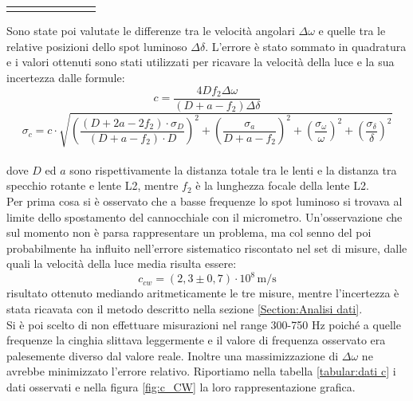 \documentclass{article}
\begin{document}
\begin{table}[H]
\begin{tabular}{c c c c c c c c}
                    \bottomrule           
                    
                    \label{tabular:rawdataCW}
                    
                \end{tabular}


            \end{table}
            Sono state poi valutate le differenze tra le velocità angolari $\Delta\omega$ e quelle tra le relative posizioni dello spot luminoso $\Delta\delta$. 
            L'errore è stato sommato in quadratura e i valori ottenuti sono stati utilizzati per ricavare la velocità della luce e la sua incertezza
            dalle formule:  
            \[ c = \frac{4 D f_2 \Delta\omega}{(D + a - f_2) \Delta\delta} \]
            \[ \sigma_c = c \cdot \sqrt{(\frac{(D + 2a - 2f_2) \cdot \sigma_D}{(D + a - f_2) \cdot D})^2 + 
                        (\frac{\sigma_a}{D + a - f_2})^2 + (\frac{\sigma_\omega}{\omega})^2 + (\frac{\sigma_\delta}{\delta})^2}
            \label{propagazione err luce} \] \\

            dove $D$ ed $a$ sono rispettivamente la distanza totale tra le lenti e la distanza tra specchio rotante e lente L2, mentre $f_2$ è la lunghezza focale della lente L2. \\
            
            Per prima cosa si è osservato che a basse frequenze lo spot luminoso si trovava al limite dello spostamento del cannocchiale con il micrometro. 
            Un'osservazione che sul momento non è parsa rappresentare un problema, ma col senno del poi probabilmente ha influito 
            nell'errore sistematico riscontato nel set di misure, dalle quali la velocità della luce media risulta essere: 
            \[ c_{cw} = (2,3 \pm 0,7) \cdot 10^8 \, \mathrm{m/s} \] risultato ottenuto mediando aritmeticamente le tre misure, mentre l'incertezza è stata ricavata 
            con il metodo descritto nella sezione \ref{Section:Analisi dati}. \\

            Si è poi scelto di non effettuare misurazioni nel range 300-750 Hz poiché a quelle frequenze la cinghia slittava leggermente e 
            il valore di frequenza osservato era palesemente diverso dal valore reale. 
            Inoltre una massimizzazione di $\Delta \omega$ ne avrebbe minimizzato l'errore relativo.
            Riportiamo nella tabella \ref{tabular:dati c} i dati osservati e nella figura \ref{fig:c_CW} la loro rappresentazione grafica.
        
\end{document}
